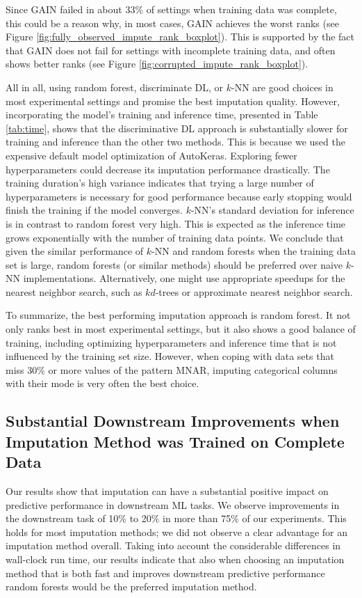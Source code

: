 Since GAIN failed in about $33\%$ of settings when training data was complete, this could be a reason why, in most cases, GAIN achieves the worst ranks (see Figure \ref{fig:fully_observed_impute_rank_boxplot}). This is supported by the fact that GAIN does not fail for settings with incomplete training data, and often shows better ranks (see Figure \ref{fig:corrupted_impute_rank_boxplot}).

All in all, using random forest, discriminate DL, or $k$-NN are good choices in most experimental settings and promise the best imputation quality. However, incorporating the model's training and inference time, presented in Table \ref{tab:time}, shows that the discriminative DL approach is substantially slower for training and inference than the other two methods. This is because we used the expensive default model optimization of AutoKeras. Exploring fewer hyperparameters could decrease its imputation performance drastically. The training duration's high variance indicates that trying a large number of hyperparameters is necessary for good performance because early stopping would finish the training if the model converges. $k$-NN's standard deviation for inference is in contrast to random forest very high. This is expected as the inference time grows exponentially with the number of training data points. We conclude that given the similar performance of $k$-NN and random forests when the training data set is large, random forests (or similar methods) should be preferred over naive $k$-NN implementations. Alternatively, one might use appropriate speedups for the nearest neighbor search, such as $kd$-trees or approximate nearest neighbor search.

To summarize, the best performing imputation approach is random forest. It not only ranks best in most experimental settings, but it also shows a good balance of training, including optimizing hyperparameters and inference time that is not influenced by the training set size. However, when coping with data sets that miss $30\%$ or more values of the pattern MNAR, imputing categorical columns with their mode is very often the best choice.


\subsection{Substantial Downstream Improvements when Imputation Method was Trained on Complete Data}
%
Our results show that imputation can have a substantial positive impact on predictive performance in downstream ML tasks. We observe improvements in the downstream task of 10\% to 20\% in more than 75\% of our experiments. This holds for most imputation methods; we did not observe a clear advantage for an imputation method overall. Taking into account the considerable differences in wall-clock run time, our results indicate that also when choosing an imputation method that is both fast and improves downstream predictive performance random forests would be the preferred imputation method.

